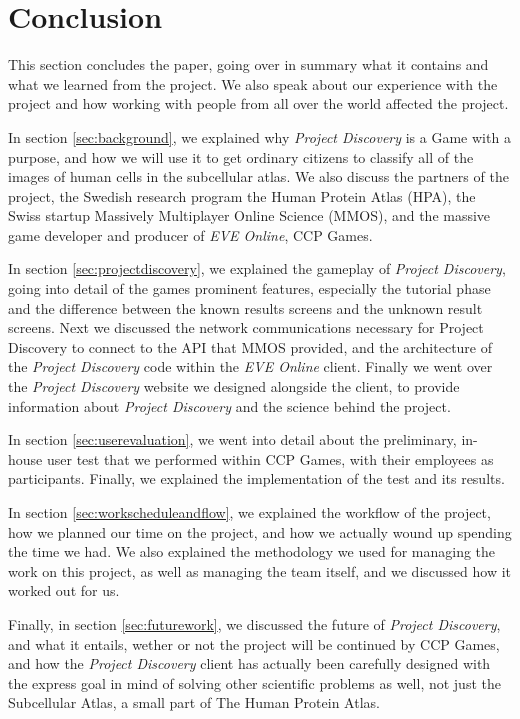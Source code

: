 \section{Conclusion}\label{sec:conclusion}

This section concludes the paper, going over in summary what it contains and what we learned from the project. We also speak about our experience with the project and how working with people from all over the world affected the project. 

In section \ref{sec:background}, we explained why \emph{Project Discovery} is a Game with a purpose, and how we will use it to get ordinary citizens to classify all of the images of human cells in the subcellular atlas. We also discuss the partners of the project, the Swedish research program the Human Protein Atlas (HPA), the Swiss startup Massively Multiplayer Online Science (MMOS), and the massive game developer and producer of \emph{EVE Online}, CCP Games.

In section \ref{sec:projectdiscovery}, we explained the gameplay of \emph{Project Discovery}, going into detail of the games prominent features, especially the tutorial phase and the difference between the known results screens and the unknown result screens. Next we discussed the network communications necessary for Project Discovery to connect to the API that MMOS provided, and the architecture of the \emph{Project Discovery} code within the \emph{EVE Online} client. Finally we went over the \emph{Project Discovery} website we designed alongside the client, to provide information about \emph{Project Discovery} and the science behind the project.

In section \ref{sec:userevaluation}, we went into detail about the preliminary, in-house user test that we performed within CCP Games, with their employees as participants. Finally, we explained the implementation of the test and its results.

In section \ref{sec:workscheduleandflow}, we explained the workflow of the project, how we planned our time on the project, and how we actually wound up spending the time we had. We also explained the methodology we used for managing the work on this project, as well as managing the team itself, and we discussed how it worked out for us.

Finally, in section \ref{sec:futurework}, we discussed the future of \emph{Project Discovery}, and what it entails, wether or not the project will be continued by CCP Games, and how the \emph{Project Discovery} client has actually been carefully designed with the express goal in mind of solving other scientific problems as well, not just the Subcellular Atlas, a small part of The Human Protein Atlas.

